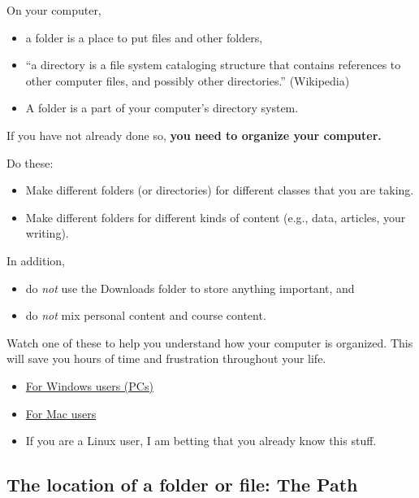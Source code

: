 \documentclass[
  letterpaper,
  DIV=11,
  numbers=noendperiod]{scrreprt}
\providecommand{\tightlist}{%
  \setlength{\itemsep}{0pt}\setlength{\parskip}{0pt}}
\begin{document}
On your computer,

\begin{itemize}
\tightlist
\item
  a folder is a place to put files and other folders,
\item
  ``a directory is a file system cataloging structure that contains
  references to other computer files, and possibly other directories.''
  (Wikipedia)
\item
  A folder is a part of your computer's directory system.
\end{itemize}

If you have not already done so, \textbf{you need to organize your
computer.}

Do these:

\begin{itemize}
\tightlist
\item
  Make different folders (or directories) for different classes that you
  are taking.
\item
  Make different folders for different kinds of content (e.g., data,
  articles, your writing).
\end{itemize}

In addition,

\begin{itemize}
\tightlist
\item
  do \emph{not} use the Downloads folder to store anything important,
  and
\item
  do \emph{not} mix personal content and course content.
\end{itemize}

Watch one of these to help you understand how your computer is
organized. This will save you hours of time and frustration throughout
your life.

\begin{itemize}
\tightlist
\item
  \href{https://youtu.be/hUW5MEKDtMM}{For Windows users (PCs)}
\item
  \href{https://youtu.be/5pOu70ta0xY}{For Mac users}
\item
  If you are a Linux user, I am betting that you already know this
  stuff.
\end{itemize}

\subsection{The location of a folder or file: The
Path}\label{the-location-of-a-folder-or-file-the-path}
\end{document}
